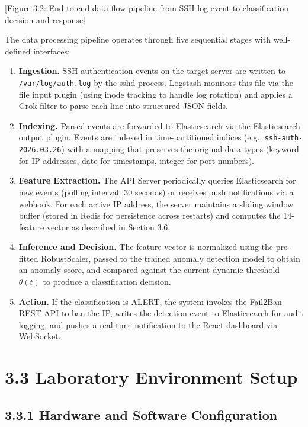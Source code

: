 \documentclass[
  a4paper]{report}
\begin{document}
{[}Figure 3.2: End-to-end data flow pipeline from SSH log event to
classification decision and response{]}

The data processing pipeline operates through five sequential stages
with well-defined interfaces:

\begin{enumerate}
\def\labelenumi{\arabic{enumi}.}
\item
  \textbf{Ingestion.} SSH authentication events on the target server are
  written to \texttt{/var/log/auth.log} by the sshd process. Logstash
  monitors this file via the file input plugin (using inode tracking to
  handle log rotation) and applies a Grok filter to parse each line into
  structured JSON fields.
\item
  \textbf{Indexing.} Parsed events are forwarded to Elasticsearch via
  the Elasticsearch output plugin. Events are indexed in
  time-partitioned indices (e.g., \texttt{ssh-auth-2026.03.26}) with a
  mapping that preserves the original data types (keyword for IP
  addresses, date for timestamps, integer for port numbers).
\item
  \textbf{Feature Extraction.} The API Server periodically queries
  Elasticsearch for new events (polling interval: 30 seconds) or
  receives push notifications via a webhook. For each active IP address,
  the server maintains a sliding window buffer (stored in Redis for
  persistence across restarts) and computes the 14-feature vector as
  described in Section 3.6.
\item
  \textbf{Inference and Decision.} The feature vector is normalized
  using the pre-fitted RobustScaler, passed to the trained anomaly
  detection model to obtain an anomaly score, and compared against the
  current dynamic threshold \(\theta(t)\) to produce a classification
  decision.
\item
  \textbf{Action.} If the classification is ALERT, the system invokes
  the Fail2Ban REST API to ban the IP, writes the detection event to
  Elasticsearch for audit logging, and pushes a real-time notification
  to the React dashboard via WebSocket.
\end{enumerate}

\section{3.3 Laboratory Environment
Setup}\label{laboratory-environment-setup}

\subsection{3.3.1 Hardware and Software
Configuration}\label{hardware-and-software-configuration}
\end{document}
